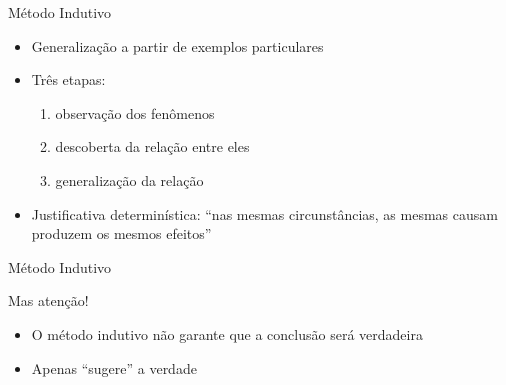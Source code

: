 \documentclass{beamer}
\begin{document}


\begin{frame}{Método Indutivo}
  \begin{itemize}
    \footnotesize
  \item \alert<1>{Generalização} a partir de exemplos particulares
    \bigskip
  \item Três etapas:
    \begin{enumerate}
      \scriptsize
    \item observação dos fenômenos
    \item descoberta da relação entre eles
    \item generalização da relação
    \end{enumerate}
    \bigskip
  \item Justificativa determinística: ``nas mesmas circunstâncias, as
    mesmas causam produzem os mesmos efeitos''
  \end{itemize}
\end{frame}


\begin{frame}{Método Indutivo}
  \begin{block}{Mas atenção!}
    \begin{itemize}
      \footnotesize
    \item O método indutivo não garante que a conclusão
      será verdadeira
      \bigskip
    \item Apenas ``sugere'' a verdade
    \end{itemize}
  \end{block}
\end{frame}
\end{document}
